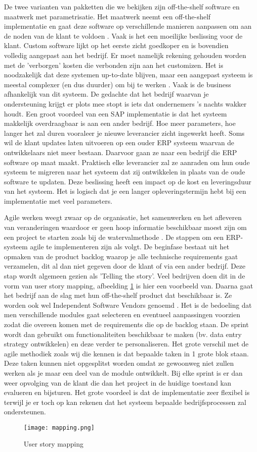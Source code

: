 De twee varianten van pakketten die we bekijken zijn off-the-shelf software en maatwerk met parametrisatie. Het maatwerk neemt een off-the-shelf implementatie en gaat deze software op verschillende manieren aanpassen om aan de noden van de klant te voldoen \autocite{Vollmer2016}. Vaak is het een moeilijke beslissing voor de klant. Custom software lijkt op het eerste zicht goedkoper en is bovendien volledig aangepast aan het bedrijf. Er moet namelijk rekening gehouden worden met de 'verborgen' kosten die verbonden zijn aan het customizen. Het is noodzakelijk dat deze systemen up-to-date blijven, maar een aangepast systeem is meestal complexer (en dus duurder) om bij te werken \autocite{Bdc2019}. Vaak is de business afhankelijk van dit systeem. De gedachte dat het bedrijf waarvan je ondersteuning krijgt er plots mee stopt is iets dat ondernemers 's nachts wakker houdt. Een groot voordeel van een SAP implementatie is dat het systeem makkelijk overdraagbaar is aan een ander bedrijf. Hoe meer parameters, hoe langer het zal duren vooraleer je nieuwe leverancier zicht ingewerkt heeft. Soms wil de klant updates laten uitvoeren op een ouder ERP systeem waarvan de ontwikkelaars niet meer bestaan. Daarvoor gaan ze naar een bedrijf die ERP software op maat maakt. Praktisch elke leverancier zal ze aanraden om hun oude systeem te migreren naar het systeem dat zij ontwikkelen in plaats van de oude software te updaten. Deze beslissing heeft een impact op de kost en leveringsduur van het systeem. Het is logisch dat je een langer opleveringstermijn hebt bij een implementatie met veel parameters.

Agile werken weegt zwaar op de organisatie, het samenwerken en het afleveren van veranderingen waardoor er geen hoop informatie beschikbaar moest zijn om een project te starten zoals bij de watervalmethode \autocite{Mrpeasy2018}. De stappen om een ERP-systeem agile te implementeren zijn als volgt. De beginfase bestaat uit het opmaken van de product backlog waarop je alle technische requirements gaat verzamelen, dit al dan niet gegeven door de klant of via een ander bedrijf. Deze stap wordt algemeen gezien als 'Telling the story'. Veel bedrijven doen dit in de vorm van user story mapping, afbeelding \ref{fig:mapping} is hier een voorbeeld van. Daarna gaat het bedrijf aan de slag met hun off-the-shelf product dat beschikbaar is. Ze worden ook wel Independent Software Vendors genoemd \autocite{Mrpeasy2018}. Het is de bedoeling dat men verschillende modules gaat selecteren en eventueel aanpassingen voorzien zodat die overeen komen met de requirements die op de backlog staan. De sprint wordt dan gebruikt om functionaliteiten beschikbaar te maken (bv. data entry strategy ontwikkelen) en deze verder te personaliseren. Het grote verschil met de agile methodiek zoals wij die kennen is dat bepaalde taken in 1 grote blok staan. Deze taken kunnen niet opgesplitst worden omdat ze gewoonweg niet zullen werken als je maar een deel van de module ontwikkelt. Bij elke sprint is er dan weer opvolging van de klant die dan het project in de huidige toestand kan evalueren en bijsturen. Het grote voordeel is dat de implementatie zeer flexibel is terwijl je er toch op kan rekenen dat het systeem bepaalde bedrijfsprocessen zal ondersteunen.

\begin{figure}[b!]
    \texttt{[image: mapping.png]}
    \caption{User story mapping}
    \label{fig:mapping}
\end{figure}